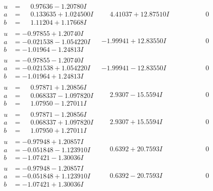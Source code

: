 \documentclass[1p]{elsarticle_modified}
\theoremstyle{definition}
\begin{document}
$$\begin{array}{c|c|c}
\begin{aligned}
u &= \phantom{-}0.97636 - 1.20780 I \\
a &= \phantom{-}0.133635 + 1.024500 I \\
b &= \phantom{-}1.11204 + 1.17668 I\end{aligned}
 & \phantom{-}4.41037 + 12.87510 I & \phantom{-0.000000 } 0 \\ \hline\begin{aligned}
u &= -0.97855 + 1.20740 I \\
a &= -0.021538 - 1.054220 I \\
b &= -1.01964 - 1.24813 I\end{aligned}
 & -1.99941 + 12.83550 I & \phantom{-0.000000 } 0 \\ \hline\begin{aligned}
u &= -0.97855 - 1.20740 I \\
a &= -0.021538 + 1.054220 I \\
b &= -1.01964 + 1.24813 I\end{aligned}
 & -1.99941 - 12.83550 I & \phantom{-0.000000 } 0 \\ \hline\begin{aligned}
u &= \phantom{-}0.97871 + 1.20856 I \\
a &= \phantom{-}0.068337 - 1.097820 I \\
b &= \phantom{-}1.07950 - 1.27011 I\end{aligned}
 & \phantom{-}2.9307 - 15.5594 I & \phantom{-0.000000 } 0 \\ \hline\begin{aligned}
u &= \phantom{-}0.97871 - 1.20856 I \\
a &= \phantom{-}0.068337 + 1.097820 I \\
b &= \phantom{-}1.07950 + 1.27011 I\end{aligned}
 & \phantom{-}2.9307 + 15.5594 I & \phantom{-0.000000 } 0 \\ \hline\begin{aligned}
u &= -0.97948 + 1.20857 I \\
a &= -0.051848 - 1.123910 I \\
b &= -1.07421 - 1.30036 I\end{aligned}
 & \phantom{-}0.6392 + 20.7593 I & \phantom{-0.000000 } 0 \\ \hline\begin{aligned}
u &= -0.97948 - 1.20857 I \\
a &= -0.051848 + 1.123910 I \\
b &= -1.07421 + 1.30036 I\end{aligned}
 & \phantom{-}0.6392 - 20.7593 I & \phantom{-0.000000 } 0 \\ \hline\begin{aligned}

\end{aligned}
\end{array}$$
\end{document}
